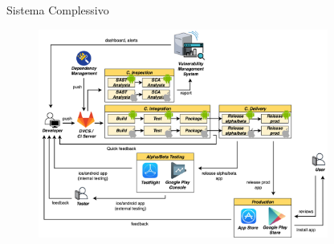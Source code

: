 \begin{frame}{Sistema Complessivo}

    \begin{figure}[H]
        \includegraphics[width=0.85\textwidth]{img/full-cicd.png}
    \end{figure}
    
\end{frame}